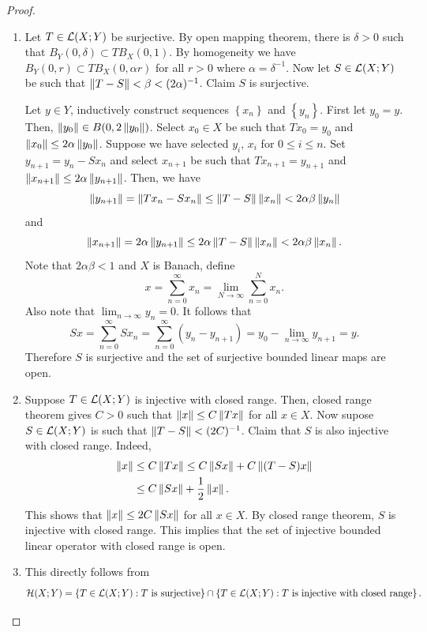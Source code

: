 \documentclass[a4paper]{article}
\begin{document}
\begin{proof}
\begin{enumerate}
\item Let $T \in \mathcal{L}(X; Y)$ be surjective. By open mapping
theorem, there is $\delta > 0$ such that $B_Y(0, \delta)
\subset TB_X(0, 1)$. By homogeneity we have
$B_Y(0, r) \subset TB_X(0, \alpha r)$ for all $r > 0$ where
$\alpha = \delta^{-1}$. Now let $S \in \mathcal{L}(X; Y)$ be such that
$\left\lVert T - S\right\rVert < \beta < (2\alpha)^{-1}$. Claim $S$ is surjective.

Let $y \in Y$, inductively construct sequences $\left\{ x_n \right\}$
and $\left\{ y_n \right\}$. First let $y_0 = y$. Then,
$\left\lVert y_0\right\rVert \in B(0, 2\left\lVert y_0\right\rVert)$. Select
$x_0 \in X$ be such that $T x_0 = y_0$ and $\left\lVert x_0\right\rVert
\leq 2 \alpha \left\lVert y_0\right\rVert$. Suppose we have selected $y_i$,
$x_i$ for $0 \leq i \leq n$. Set $y_{n+1} = y_n - S x_n$
and select $x_{n+1}$ be such that $T x_{n+1} = y_{n+1}$
and $\left\lVert x_{n+1}\right\rVert \leq 2\alpha \left\lVert y_{n+1}\right\rVert$.
Then, we have
\[
\left\lVert y_{n+1}\right\rVert = \left\lVert T x_n - S x_n\right\rVert \leq
\left\lVert T - S\right\rVert \left\lVert x_n\right\rVert < 2 \alpha\beta \left\lVert y_n\right\rVert
\]
and
\[
\left\lVert x_{n+1}\right\rVert = 2 \alpha \left\lVert y_{n+1}\right\rVert \leq
2 \alpha \left\lVert T - S\right\rVert \left\lVert x_n\right\rVert < 2 \alpha \beta \left\lVert x_n\right\rVert.
\]
Note that $2 \alpha\beta < 1$ and $X$ is Banach, define
\[
x = \sum_{n=0}^\infty x_n = \lim_{N \to \infty}
\sum_{n = 0}^N x_n.
\]
Also note that $\lim_{n \to \infty} y_n = 0$. It follows
that
\[
S x = \sum_{n=0}^\infty S x_n
= \sum_{n=0}^\infty (y_n - y_{n+1})
= y_0 - \lim_{n \to \infty} y_{n+1} = y.
\]
Therefore $S$ is surjective and the set of surjective
bounded linear maps are open.

\item Suppose $T \in \mathcal{L}(X; Y)$ is injective with closed range.
Then, closed range theorem gives $C > 0$ such that
$\left\lVert x\right\rVert \leq C \left\lVert T x\right\rVert$ for all $x \in X$. Now supose
$S \in \mathcal{L}(X; Y)$ is such that $\left\lVert T - S\right\rVert < (2C)^{-1}$.
Claim that $S$ is also injective with closed range. Indeed,
\[
\begin{aligned}
  \left\lVert x\right\rVert &\leq C\left\lVert T x\right\rVert \leq C \left\lVert Sx\right\rVert + C \left\lVert (T-S)x\right\rVert \\
  & \leq C \left\lVert Sx\right\rVert + \frac{1}{2}\left\lVert x\right\rVert.
\end{aligned}
\]
This shows that $\left\lVert x\right\rVert \leq 2C \left\lVert Sx\right\rVert$ for all $x \in X$.
By closed range theorem, $S$ is injective with closed range.
This implies that the set of injective bounded linear operator
with closed range is open.

\item This directly follows from
\[
\mathcal{H}(X; Y) = \left\{ T \in \mathcal{L}(X; Y) : \text{$T$ is surjective} \right\}
\cap \left\{ T \in \mathcal{L}(X; Y) : \text{$T$ is injective with closed range} \right\}.
\]
\end{enumerate}

\end{proof}
\end{document}
